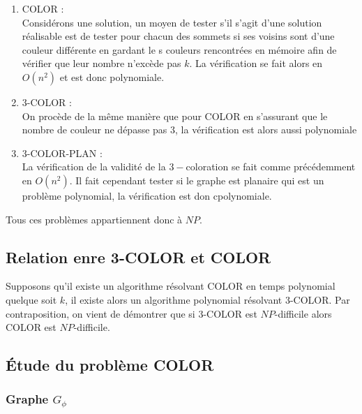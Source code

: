 \begin{enumerate}
	\item COLOR : \\
		Considérons une solution, un moyen de tester s'il s'agit d'une solution réalisable est de tester
		pour chacun des sommets si ses voisins sont d'une couleur différente en gardant le s couleurs
		rencontrées en mémoire afin de vérifier que leur nombre n'excède pas $k$. La vérification se
		fait alors en $O(n^2)$ et est donc polynomiale.
	\item 3-COLOR : \\
		On procède de la même manière que pour COLOR en s'assurant que le nombre de couleur ne dépasse
		pas $3$, la vérification est alors aussi polynomiale
	\item 3-COLOR-PLAN : \\
		La vérification de la validité de la $3-$coloration se fait comme précédemment en $O(n^2)$. Il
		fait cependant tester si le graphe est planaire qui est un problème polynomial, la vérification
		est don cpolynomiale.
\end{enumerate}

Tous ces problèmes appartiennent donc à $NP$.

\subsection{Relation enre 3-COLOR et COLOR}

Supposons qu'il existe un algorithme résolvant COLOR en temps polynomial quelque soit $k$, il existe
alors un algorithme polynomial résolvant 3-COLOR. Par contraposition, on vient de démontrer que si
3-COLOR est $NP$-difficile alors COLOR est $NP$-difficile.

\subsection{Étude du problème COLOR}

\subsubsection{Graphe $G_{\phi}$}

